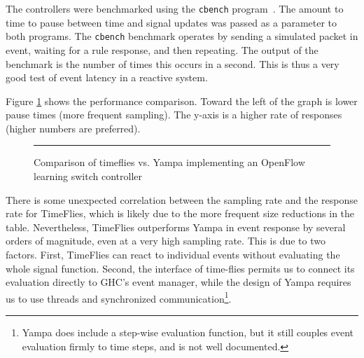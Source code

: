 The controllers were benchmarked using the {\tt cbench} program~\cite{cbench}. The
amount to time to pause between time and signal updates was passed as a parameter to
both programs. The {\tt cbench} benchmark operates by sending a simulated packet in
event, waiting for a rule response, and then repeating. The output of the benchmark
is the number of times this occurs in a second. This is thus a very good test of
event latency in a reactive system.

Figure \ref{fig:timeflies-yampa-comparison} shows the performance comparison.
Toward the left of the graph is lower pause times (more frequent sampling). The
y-axis is a higher rate of responses (higher numbers are preferred). 

\begin{figure}
\hrule
\caption{Comparison of timeflies vs. Yampa implementing an OpenFlow learning switch controller}
\label{fig:timeflies-yampa-comparison}
\end{figure}

There is some unexpected correlation between the sampling rate and the response rate
for TimeFlies, which is likely due to the more frequent size reductions in the table.
Nevertheless, TimeFlies outperforms Yampa in event response by several orders of magnitude,
even at a very high sampling rate. This is due to two factors. First, TimeFlies can react
to individual events without evaluating the whole signal function. Second, the
interface of time-flies permits us to connect its evaluation directly to GHC's event
manager, while the design of Yampa requires us to use threads and synchronized communication\footnote{Yampa does include a step-wise evaluation function, but it still couples event
evaluation firmly to time steps, and is not well documented.}.


